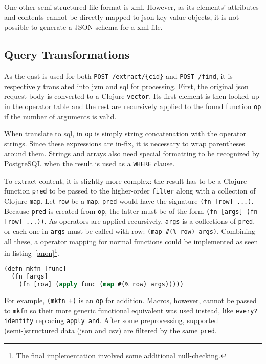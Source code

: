 One other semi-structured file format is \gls{xml}.  However, as its elements'
attributes and contents cannot be directly mapped to \gls{json} key-value
objects, it is not possible to generate a JSON schema for a \gls{xml} file.

\subsection{Query Transformations}
As the \gls{qast} is used for both \verb|POST /extract/{cid}|
and \verb|POST /find|, it is respectively translated into \gls{jvm}
and \gls{sql} for processing.  First, the original \gls{json} request body
is converted to a Clojure \verb|vector|.  Its first element is then looked up
in the operator table and the rest are recursively applied to the found function
\verb|op| if the number of arguments is valid.

When translate to \gls{sql}, in \verb|op| is simply string concatenation
with the operator strings.  Since these expressions are in-fix, it is necessary
to wrap parentheses around them.  Strings and arrays also need special
formatting to be recognized by PostgreSQL when the result is used
as a \verb|WHERE| clause.

To extract content, it is slightly more complex: the result has to be
a Clojure function \verb|pred| to be passed to the higher-order \verb|filter|
along with a collection of Clojure \verb|map|.  Let \verb|row| be
a \verb|map|, \verb|pred| would have the signature \verb|(fn [row] ...)|.
Because \verb|pred| is created from \verb|op|, the latter must be of the form
\verb|(fn [args] (fn [row] ...))|.  As operators are applied recursively,
\verb|args| is a collections of \verb|pred|, or each one in \verb|args|
must be called with row: \verb|(map #(% row) args)|.  Combining all these,
a operator mapping for normal functions could be implemented as seen in
listing~\ref{anon}\footnote{The final implementation involved some additional
null-checking.}.
\begin{lstlisting}[label=anon,caption=Constructing a function returning
  another one lazily applying given the given one,language=lisp]
(defn mkfn [func]
  (fn [args]
    (fn [row] (apply func (map #(% row) args)))))
\end{lstlisting}

For example, \verb|(mkfn +)| is an \verb|op| for addition.  Macros, however,
cannot be passed to \verb|mkfn| so their more generic functional equivalent
was used instead, like \verb|every? identity| replacing \verb|apply and|.
After some preprocessing, supported (semi-)structured data (\gls{json}
and \gls{csv}) are filtered by the same \verb|pred|.

